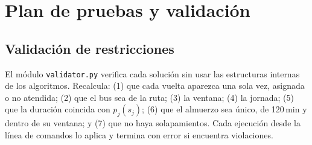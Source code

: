 \section{Plan de pruebas y validación}\label{sec:pruebas}

\subsection{Validación de restricciones}\label{sec:validador}
El módulo \texttt{validator.py} verifica cada solución sin usar las estructuras internas de los algoritmos. Recalcula: (1) que cada vuelta aparezca una sola vez, asignada o no atendida; (2) que el bus sea de la ruta; (3) la ventana; (4) la jornada; (5) que la duración coincida con $p_j(s_j)$; (6) que el almuerzo sea único, de 120\,min y dentro de su ventana; y (7) que no haya solapamientos. Cada ejecución desde la línea de comandos lo aplica y termina con error si encuentra violaciones.


